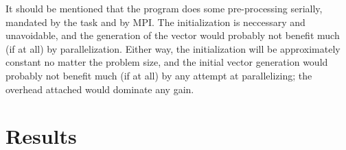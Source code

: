 \documentclass[fontsize=11pt,paper=a4,titlepage]{report}
\begin{document}
It should be mentioned that the program does some pre-processing serially, mandated by the task and
by MPI. The initialization is neccessary and unavoidable, and the generation of the vector would probably
not benefit much (if at all) by parallelization. Either way, the initialization will be approximately constant no matter the problem size, and the initial vector generation would probably not benefit much (if at all) by any attempt at parallelizing; the overhead attached would dominate any gain.

\section{Results}

\end{document}
